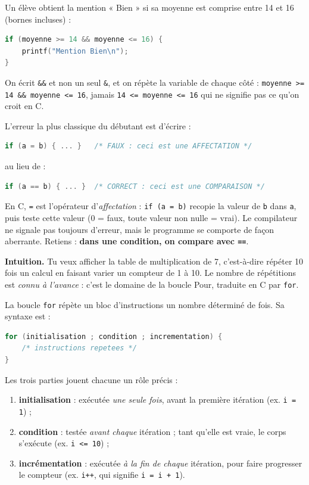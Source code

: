 \documentclass[11pt]{article}
\newcommand{\cle}[1]{{\popxbold\color{popdark}#1}}
\newcounter{popsec}
\newcounter{popsub}
\newcommand{\courssub}[1]{%
  \stepcounter{popsub}%
  \par\vspace{9pt}\noindent{\popxbold\fontsize{11.5}{13}\selectfont\color{popink}{\color{poporange}\thepopsec.\thepopsub}\hspace{6pt}#1}\par\nopagebreak\vspace{4pt}
}
\begin{document}
\begin{exemplebox}
Un élève obtient la mention « Bien » si sa moyenne est comprise entre 14 et 16 (bornes incluses) :
\begin{lstlisting}[language=C]
if (moyenne >= 14 && moyenne <= 16) {
    printf("Mention Bien\n");
}
\end{lstlisting}
On écrit \texttt{\&\&} et non un seul \texttt{\&}, et on répète la variable de chaque côté : \texttt{moyenne >= 14 \&\& moyenne <= 16}, jamais \texttt{14 <= moyenne <= 16} qui ne signifie pas ce qu'on croit en C.
\end{exemplebox}

\begin{attention}[Le piège du \texttt{=} dans un test]
L'erreur la plus classique du débutant est d'écrire :
\begin{lstlisting}[language=C]
if (a = b) { ... }   /* FAUX : ceci est une AFFECTATION */
\end{lstlisting}
au lieu de :
\begin{lstlisting}[language=C]
if (a == b) { ... }  /* CORRECT : ceci est une COMPARAISON */
\end{lstlisting}
En C, \texttt{=} est l'opérateur d'\emph{affectation} : \texttt{if (a = b)} recopie la valeur de \texttt{b} dans \texttt{a}, puis teste cette valeur (0 = faux, toute valeur non nulle = vrai). Le compilateur ne signale pas toujours d'erreur, mais le programme se comporte de façon aberrante. Retiens : \textbf{dans une condition, on compare avec \texttt{==}}.
\end{attention}

\courssub{La boucle \texttt{for} : traduction du \cle{Pour}}

\textbf{Intuition.} Tu veux afficher la table de multiplication de 7, c'est-à-dire répéter 10 fois un calcul en faisant varier un compteur de 1 à 10. Le nombre de répétitions est \emph{connu à l'avance} : c'est le domaine de la boucle \cle{Pour}, traduite en C par \texttt{for}.

\begin{definition}
La boucle \texttt{for} répète un bloc d'instructions un nombre déterminé de fois. Sa syntaxe est :
\begin{lstlisting}[language=C]
for (initialisation ; condition ; incrementation) {
    /* instructions repetees */
}
\end{lstlisting}
Les trois parties jouent chacune un rôle précis :
\begin{enumerate}
\item \textbf{initialisation} : exécutée \emph{une seule fois}, avant la première itération (ex. \texttt{i = 1}) ;
\item \textbf{condition} : testée \emph{avant chaque} itération ; tant qu'elle est vraie, le corps s'exécute (ex. \texttt{i <= 10}) ;
\item \textbf{incrémentation} : exécutée \emph{à la fin de chaque} itération, pour faire progresser le compteur (ex. \texttt{i++}, qui signifie \texttt{i = i + 1}).
\end{enumerate}
\end{definition}
\end{document}
